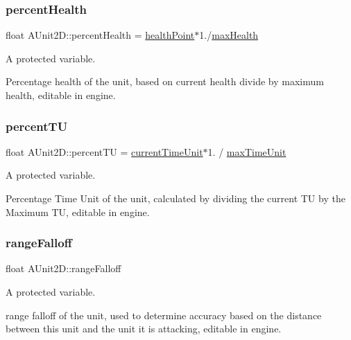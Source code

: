 \subsubsection{\texorpdfstring{percent\+Health}{percentHealth}}
{\footnotesize\ttfamily float A\+Unit2\+D\+::percent\+Health = \hyperlink{class_a_unit2_d_a251c25f80c0fe087b892d82baf8cfa0d}{health\+Point}$\ast$1./\hyperlink{class_a_unit2_d_a7c93157ba7198cdb15bde2e3b649988d}{max\+Health}\hspace{0.3cm}{\ttfamily [protected]}}



A protected variable. 

Percentage health of the unit, based on current health divide by maximum health, editable in engine. \hypertarget{class_a_unit2_d_a45d8a7f3f28c1a641dd4124c4b7ba272}{}\label{class_a_unit2_d_a45d8a7f3f28c1a641dd4124c4b7ba272} 
\subsubsection{\texorpdfstring{percent\+TU}{percentTU}}
{\footnotesize\ttfamily float A\+Unit2\+D\+::percent\+TU = \hyperlink{class_a_unit2_d_a24f6252522a9d97f9ea8ea9cbf6cca69}{current\+Time\+Unit}$\ast$1. / \hyperlink{class_a_unit2_d_a0a8041a5fc46bd09fed79303fbcd3ce5}{max\+Time\+Unit}\hspace{0.3cm}{\ttfamily [protected]}}



A protected variable. 

Percentage Time Unit of the unit, calculated by dividing the current TU by the Maximum TU, editable in engine. \hypertarget{class_a_unit2_d_a6945ed1b7f56335e3c42d414f9e9b243}{}\label{class_a_unit2_d_a6945ed1b7f56335e3c42d414f9e9b243} 
\subsubsection{\texorpdfstring{range\+Falloff}{rangeFalloff}}
{\footnotesize\ttfamily float A\+Unit2\+D\+::range\+Falloff\hspace{0.3cm}{\ttfamily [protected]}}



A protected variable. 

range falloff of the unit, used to determine accuracy based on the distance between this unit and the unit it is attacking, editable in engine. \hypertarget{class_a_unit2_d_a178510f321f19d1fa8b19b1a16b7dcfb}{}\label{class_a_unit2_d_a178510f321f19d1fa8b19b1a16b7dcfb} 
